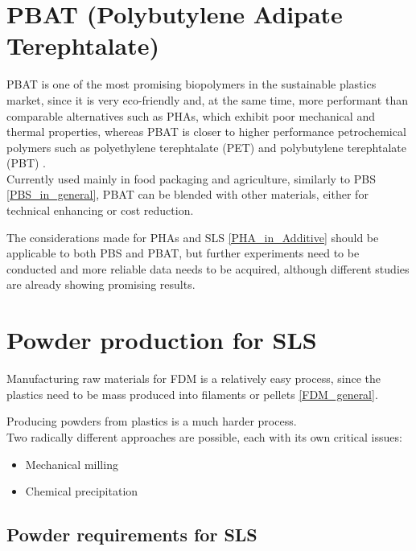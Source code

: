 \documentclass{article}
\begin{document}
    


    \clearpage

    \section{PBAT (Polybutylene Adipate Terephtalate) \label{PBAT_in_general}}

    PBAT is one of the most promising biopolymers in the sustainable plastics market, since it is very eco-friendly and, at the same time, 
    more performant than comparable alternatives such as PHAs, which exhibit poor mechanical and thermal properties, whereas PBAT is closer to 
    higher performance petrochemical polymers such as polyethylene terephtalate (PET) and polybutylene terephtalate (PBT) 
    \autocites*{Jian_PBAT_overview}. \\

    Currently used mainly in food packaging and agriculture, similarly to PBS \ref{PBS_in_general}, PBAT can be blended with other materials, either 
    for technical enhancing or cost reduction.  

    The considerations made for PHAs and SLS \ref{PHA_in_Additive} should be applicable to both PBS and PBAT, but further experiments need to 
    be conducted and more reliable data needs to be acquired, although different studies are already showing promising results.  

    \clearpage

    \section{Powder production for SLS \label{Powder_production}}

    Manufacturing raw materials for FDM is a relatively easy process, since the plastics need to be mass produced into filaments or pellets \ref{FDM_general}.

    Producing powders from plastics is a much harder process. \\ 

    Two radically different approaches are possible, each with its own critical issues: 

    \begin{itemize}
        \item Mechanical milling
        \item Chemical precipitation
    \end{itemize} 

    \subsection{Powder requirements for SLS \label{Powder_requirements}}
\end{document}
